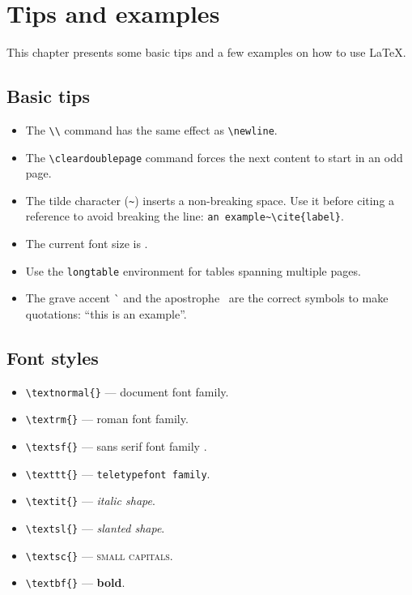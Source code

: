 \chapter{Tips and examples}
\label{ch:tips-and-examples}

This chapter presents some basic tips and a few examples on how to use \LaTeX.

\section{Basic tips}
\label{sec:basic-tips}

\begin{itemize}
\item
The \verb+\\+ command has the same effect as \verb+\newline+.
\item
The \verb+\cleardoublepage+ command forces the next content to start in an odd page.
\item
The tilde character (\verb+~+) inserts a non-breaking space. Use it before citing a reference to avoid breaking the line: \verb+an example~\cite{label}+.
\item
The current font size is \myfontsize.
\item
Use the \verb+longtable+ environment for tables spanning multiple pages.
\item
The grave accent \`{} and the apostrophe \textquotesingle\ are the correct symbols to make quotations: ``this is an example''.
\end{itemize}

\section{Font styles}
\label{sec:font-styles}

\begin{itemize}
\item
\verb+\textnormal{}+ --- \textnormal{document font family}.
\item
\verb+\textrm{}+ --- \textrm{roman font family}.
\item
\verb+\textsf{}+ --- \textsf{sans serif font family }.
\item
\verb+\texttt{}+ --- \texttt{teletypefont family}.
\item
\verb+\textit{}+ --- \textit{italic shape}.
\item
\verb+\textsl{}+ --- \textsl{slanted shape}.
\item
\verb+\textsc{}+ --- \textsc{small capitals}.
\item
\verb+\textbf{}+ --- \textbf{bold}.
\end{itemize}

